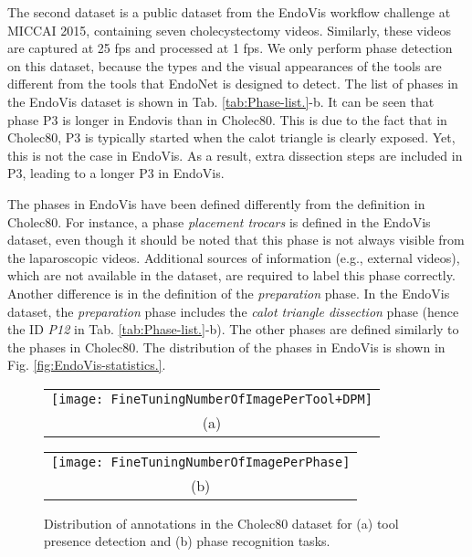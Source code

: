 \documentclass[journal]{IEEEtran} \usepackage{amssymb}
\begin{document}
The second dataset is a public dataset from the EndoVis workflow challenge at MICCAI 2015,
containing seven cholecystectomy videos. Similarly, these videos are captured
at 25 fps and processed at 1 fps. We only perform phase detection on this dataset, because the types and the visual appearances of the tools are different from the tools that EndoNet is designed to detect. The list of phases in the EndoVis dataset is
shown in Tab. \ref{tab:Phase-list.}-b. It can be seen that phase P3 is longer in Endovis than in Cholec80. This is due to the fact that in Cholec80, P3 is typically started when the calot triangle is clearly exposed. Yet, this is not the case in EndoVis. As a result, extra dissection steps are included in P3, leading to a longer P3 in EndoVis. 

The phases in EndoVis have been defined differently from the definition in Cholec80. For instance, a phase \textit{placement trocars} is defined in the EndoVis dataset, even though it should be noted that this phase is not always visible from the laparoscopic videos. Additional sources of information (e.g., external videos), which are not available in the dataset, are required to label this phase correctly. Another difference is in the definition of the \textit{preparation} phase. In the EndoVis dataset, the \textit{preparation} phase  includes the \textit{calot triangle dissection} phase (hence the ID \textit{P12} in Tab. \ref{tab:Phase-list.}-b). The other phases are defined similarly to the phases in Cholec80. The distribution of the phases in EndoVis is shown in Fig. \ref{fig:EndoVis-statistics.}. 

\begin{figure}
\begin{centering}
\begin{tabular}{c}
\texttt{[image: FineTuningNumberOfImagePerTool+DPM]}\tabularnewline
{\scriptsize (a)}\tabularnewline
\end{tabular}
\par\end{centering}

\begin{centering}
\begin{tabular}{c}
\texttt{[image: FineTuningNumberOfImagePerPhase]}\tabularnewline
{\scriptsize (b)}\tabularnewline
\end{tabular}
\par\end{centering}

\caption{Distribution of annotations in the Cholec80 dataset for (a) tool presence
detection and (b) phase recognition tasks. \label{fig:Dataset-statistics.}}


\end{figure}
\end{document}
